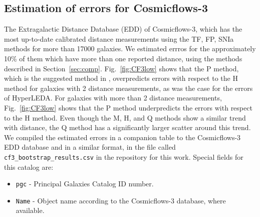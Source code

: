 \documentclass[a4paper,fleqn,usenatbib]{mnras}
\begin{document}
\subsection{Estimation of errors for Cosmicflows-3}
The Extragalactic Distance Database (EDD) of Cosmicflows-3, which has the most up-to-date calibrated distance measurements using the TF, FP, SNIa methods for more than 17000 galaxies. We estimated errros for the approximately 10\% of them which have more than one reported distance, using the methods described in Section~\ref{sec:comp}. Fig.~\ref{fig:CF3low} shows that the P method, which is the suggested method in \citet{cosmicflows}, overpredicts errors with respect to the H method for galaxies with 2 distance measurements, as was the case for the errors of HyperLEDA. For galaxies with more than 2 distance measurements, Fig.~\ref{fig:CF3low} shows that the P method underpredicts the errors with respect to the H method. Even though the M, H, and Q methods show a similar trend with distance, the Q method has a significantly larger scatter around this trend. We compiled the estimated errors in a companion table to the Cosmicflows-3 EDD database and in a similar format, in the file called \texttt{cf3\_bootstrap\_results.csv} in the repository for this work. Special fields for this catalog are:
\begin{itemize}
\item \texttt{pgc} - Principal Galaxies Catalog ID number.
\item \texttt{Name} - Object name according to the Cosmicflows-3 database, where available.
\end{itemize}
\end{document}
